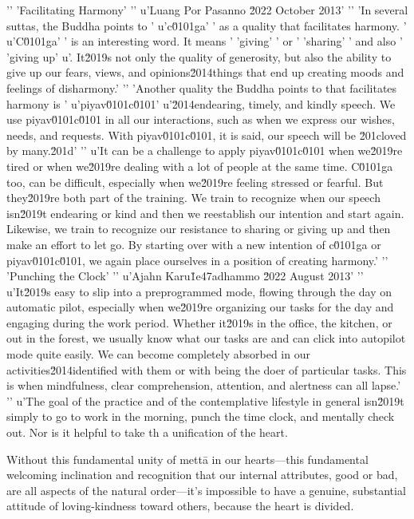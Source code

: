 '\n'
'Facilitating Harmony'
'\n'
u'Luang Por Pasanno \u2022 October 2013'
'\n'
'In several suttas, the Buddha points to '
u'c\u0101ga'
' as a quality that facilitates harmony. '
u'C\u0101ga'
' is an interesting word. It means '
'giving'
' or '
'sharing'
' and also '
'giving up'
u'. It\u2019s not only the quality of generosity, but also the ability to give up our fears, views, and opinions\u2014things that end up creating moods and feelings of disharmony.'
'\n'
'Another quality the Buddha points to that facilitates harmony is '
u'piyav\u0101c\u0101'
u'\u2014endearing, timely, and kindly speech. We use piyav\u0101c\u0101 in all our interactions, such as when we express our wishes, needs, and requests. With piyav\u0101c\u0101, it is said, our speech will be \u201cloved by many.\u201d'
'\n'
u'It can be a challenge to apply piyav\u0101c\u0101 when we\u2019re tired or when we\u2019re dealing with a lot of people at the same time. C\u0101ga too, can be difficult, especially when we\u2019re feeling stressed or fearful. But they\u2019re both part of the training. We train to recognize when our speech isn\u2019t endearing or kind and then we reestablish our intention and start again. Likewise, we train to recognize our resistance to sharing or giving up and then make an effort to let go. By starting over with a new intention of c\u0101ga or piyav\u0101c\u0101, we again place ourselves in a position of creating harmony.'
'\n'
'Punching the Clock'
'\n'
u'Ajahn Karu\u1e47adhammo \u2022 August 2013'
'\n'
u'It\u2019s easy to slip into a preprogrammed mode, flowing through the day on automatic pilot, especially when we\u2019re organizing our tasks for the day and engaging during the work period. Whether it\u2019s in the office, the kitchen, or out in the forest, we usually know what our tasks are and can click into autopilot mode quite easily. We can become completely absorbed in our activities\u2014identified with them or with being the doer of particular tasks. This is when mindfulness, clear comprehension, attention, and alertness can all lapse.'
'\n'
u'The goal of the practice and of the contemplative lifestyle in general isn\u2019t simply to go to work in the morning, punch the time clock, and mentally check out. Nor is it helpful to take th a 
unification of the heart.

Without this fundamental unity of mettā in our hearts---this 
fundamental welcoming inclination and recognition that our internal 
attributes, good or bad, are all aspects of the natural order---it's 
impossible to have a genuine, substantial attitude of loving-kindness 
toward others, because the heart is divided.

